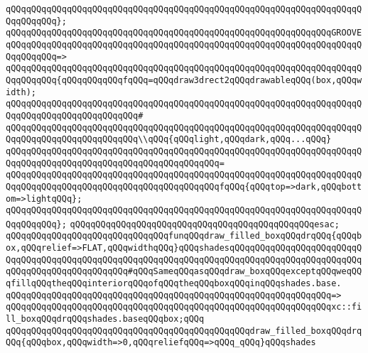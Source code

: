 \verb|qQQqqQQqqQQqqQQqqQQqqQQqqQQqqQQqqQQqqQQqqQQqqQQqqQQqqQQqqQQqqQQqqQQqqQQqqQQqqQQq};|\newline
\newline
\verb|qQQqqQQqqQQqqQQqqQQqqQQqqQQqqQQqqQQqqQQqqQQqqQQqqQQqqQQqqQQqqQQqGROOVE|\newline
\verb|qQQqqQQqqQQqqQQqqQQqqQQqqQQqqQQqqQQqqQQqqQQqqQQqqQQqqQQqqQQqqQQqqQQqqQQqqQQqqQQq=>|\newline
\verb|qQQqqQQqqQQqqQQqqQQqqQQqqQQqqQQqqQQqqQQqqQQqqQQqqQQqqQQqqQQqqQQqqQQqqQQqqQQqqQQq{qQQqqQQqqQQqfqQQq=qQQqdraw3drect2qQQqdrawableqQQq(box,qQQqwidth);|\newline
\verb|qQQqqQQqqQQqqQQqqQQqqQQqqQQqqQQqqQQqqQQqqQQqqQQqqQQqqQQqqQQqqQQqqQQqqQQqqQQqqQQqqQQqqQQqqQQqqQQq#|\newline
\verb|qQQqqQQqqQQqqQQqqQQqqQQqqQQqqQQqqQQqqQQqqQQqqQQqqQQqqQQqqQQqqQQqqQQqqQQqqQQqqQQqqQQqqQQqqQQqqQQq\\qQQq{qQQqlight,qQQqdark,qQQq...qQQq}|\newline
\verb|qQQqqQQqqQQqqQQqqQQqqQQqqQQqqQQqqQQqqQQqqQQqqQQqqQQqqQQqqQQqqQQqqQQqqQQqqQQqqQQqqQQqqQQqqQQqqQQqqQQqqQQqqQQqqQQq=|\newline
\verb|qQQqqQQqqQQqqQQqqQQqqQQqqQQqqQQqqQQqqQQqqQQqqQQqqQQqqQQqqQQqqQQqqQQqqQQqqQQqqQQqqQQqqQQqqQQqqQQqqQQqqQQqqQQqqQQqfqQQq{qQQqtop=>dark,qQQqbottom=>lightqQQq};|\newline
\verb|qQQqqQQqqQQqqQQqqQQqqQQqqQQqqQQqqQQqqQQqqQQqqQQqqQQqqQQqqQQqqQQqqQQqqQQqqQQqqQQq};|\newline
\verb|qQQqqQQqqQQqqQQqqQQqqQQqqQQqqQQqqQQqqQQqqQQqqQQqesac;|\newline
\newline
\verb|qQQqqQQqqQQqqQQqqQQqqQQqqQQqqQQqfunqQQqdraw_filled_boxqQQqdrqQQq{qQQqbox,qQQqrelief=>FLAT,qQQqwidthqQQq}qQQqshadesqQQqqQQqqQQqqQQqqQQqqQQqqQQqqQQqqQQqqQQqqQQqqQQqqQQqqQQqqQQqqQQqqQQqqQQqqQQqqQQqqQQqqQQqqQQqqQQqqQQqqQQqqQQqqQQqqQQqqQQq#qQQqSameqQQqasqQQqdraw_boxqQQqexceptqQQqweqQQqfillqQQqtheqQQqinteriorqQQqofqQQqtheqQQqboxqQQqinqQQqshades.base.|\newline
\verb|qQQqqQQqqQQqqQQqqQQqqQQqqQQqqQQqqQQqqQQqqQQqqQQqqQQqqQQqqQQqqQQq=>|\newline
\verb|qQQqqQQqqQQqqQQqqQQqqQQqqQQqqQQqqQQqqQQqqQQqqQQqqQQqqQQqqQQqqQQqxc::fill_boxqQQqdrqQQqshades.baseqQQqbox;qQQq|\newline
\newline
\verb|qQQqqQQqqQQqqQQqqQQqqQQqqQQqqQQqqQQqqQQqqQQqqQQqdraw_filled_boxqQQqdrqQQq{qQQqbox,qQQqwidth=>0,qQQqreliefqQQq=>qQQq_qQQq}qQQqshades|\newline
